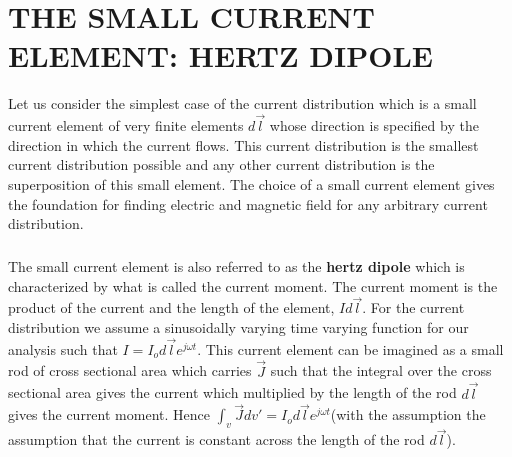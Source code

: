	\chapter{THE SMALL CURRENT ELEMENT: HERTZ DIPOLE}
	Let us consider the simplest case of the current distribution which is a small current element of very finite elements $d\vec{l}$ whose direction is specified by the direction in which the current flows. This current distribution is the smallest current distribution possible and any other current distribution is the superposition of this small element. The choice of a small current element gives the foundation for finding electric and magnetic field for any arbitrary current distribution.
	\paragraph*{}The small current element is also referred to as the \textbf{hertz dipole} which is characterized by what is called the current moment. The current moment is the product of the current and the length of the element, $Id\vec{l}$. For the current distribution we assume a sinusoidally varying time varying function for our analysis such that $I = I_od\vec{l}e^{j\omega t}$. This current element can be imagined as a small rod of cross sectional area which carries $\vec{J}$ such that the integral over the cross sectional area gives the current which multiplied by the length of the rod $d\vec{l}$ gives the current moment. Hence $\int_v\vec{J}dv' = I_od\vec{l}e^{j\omega t}$(with the assumption the assumption that the current is constant across the length of the rod $d\vec{l}$). \\ 
	
